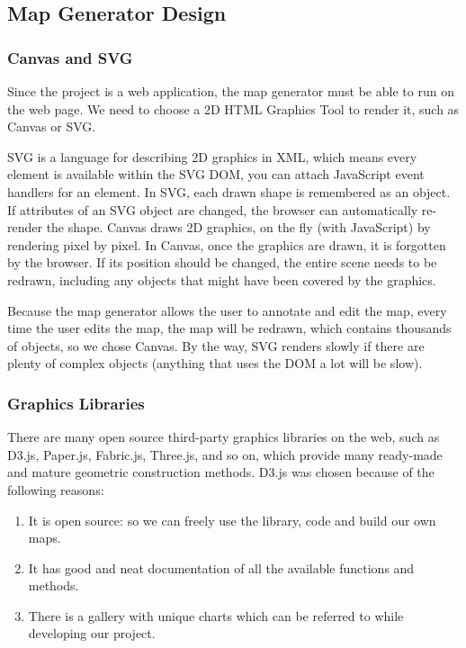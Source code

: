 \subsection{Map Generator Design}
\label{sec:Design>Map Generator Design}
\subsubsection{Canvas and SVG}
\label{sec:Design>Map Generator Design>Canvas and SVG}
Since the project is a web application, the map generator must be able to run on the web page. We need to choose a 2D HTML Graphics Tool to render it, such as Canvas or SVG.

SVG is a language for describing 2D graphics in XML, which means every element is available within the SVG DOM, you can attach JavaScript event handlers for an element. In SVG, each drawn shape is remembered as an object. If attributes of an SVG object are changed, the browser can automatically re-render the shape. Canvas draws 2D graphics, on the fly (with JavaScript) by rendering pixel by pixel. In Canvas, once the graphics are drawn, it is forgotten by the browser. If its position should be changed, the entire scene needs to be redrawn, including any objects that might have been covered by the graphics.

Because the map generator allows the user to annotate and edit the map, every time the user edits the map, the map will be redrawn, which contains thousands of objects, so we chose Canvas. By the way, SVG renders slowly if there are plenty of complex objects (anything that uses the DOM a lot will be slow).

\subsubsection{Graphics Libraries}
\label{sec:Design>Map Generator Design>Graphics Libraries}
There are many open source third-party graphics libraries on the web, such as D3.js, Paper.js, Fabric.js, Three.js, and so on, which provide many ready-made and mature geometric construction methods. D3.js was chosen because of the following reasons:
\begin{enumerate}
  \item It is open source: so we can freely use the library, code and build our own maps.
  \item It has good and neat documentation of all the available functions and methods.
  \item There is a gallery with unique charts which can be referred to while developing our project.
\end{enumerate}

